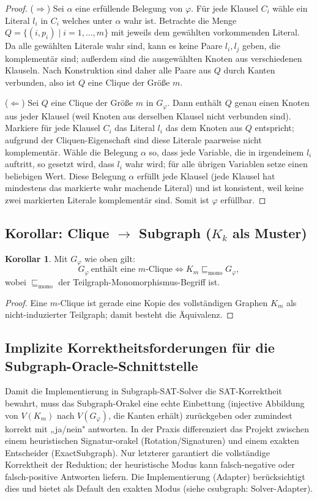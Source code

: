 \documentclass[a4paper,12pt]{article}
\theoremstyle{definition}
\newtheorem{korollar}{Korollar}[section]
\begin{document}
\begin{proof}
($\Rightarrow$) Sei $\alpha$ eine erfüllende Belegung von $\varphi$. Für jede Klausel $C_i$ wähle ein Literal $l_{i}$ in $C_i$ welches unter $\alpha$ wahr ist. Betrachte die Menge $Q=\{(i,p_i)\mid i=1,\dots,m\}$ mit jeweils dem gewählten vorkommenden Literal. Da alle gewählten Literale wahr sind, kann es keine Paare $l_{i}, l_{j}$ geben, die komplementär sind; außerdem sind die ausgewählten Knoten aus verschiedenen Klauseln. Nach Konstruktion sind daher alle Paare aus $Q$ durch Kanten verbunden, also ist $Q$ eine Clique der Größe $m$.

($\Leftarrow$) Sei $Q$ eine Clique der Größe $m$ in $G_\varphi$. Dann enthält $Q$ genau einen Knoten aus jeder Klausel (weil Knoten aus derselben Klausel nicht verbunden sind). Markiere für jede Klausel $C_i$ das Literal $l_i$ das dem Knoten aus $Q$ entspricht; aufgrund der Cliquen-Eigenschaft sind diese Literale paarweise nicht komplementär. Wähle die Belegung $\alpha$ so, dass jede Variable, die in irgendeinem $l_i$ auftritt, so gesetzt wird, dass $l_i$ wahr wird; für alle übrigen Variablen setze einen beliebigen Wert. Diese Belegung $\alpha$ erfüllt jede Klausel (jede Klausel hat mindestens das markierte wahr machende Literal) und ist konsistent, weil keine zwei markierten Literale komplementär sind. Somit ist $\varphi$ erfüllbar.
\end{proof}

\subsection{Korollar: Clique $\to$ Subgraph ($K_k$ als Muster)}
\begin{korollar}
Mit $G_\varphi$ wie oben gilt:
\[
G_\varphi\ \text{enthält eine } m\text{-Clique} \iff K_m \sqsubseteq_{\mathrm{mono}} G_\varphi,
\]
wobei $\sqsubseteq_{\mathrm{mono}}$ der Teilgraph-Monomorphismus-Begriff ist.
\end{korollar}
\begin{proof}
Eine $m$-Clique ist gerade eine Kopie des vollständigen Graphen $K_m$ als nicht-induzierter Teilgraph; damit besteht die Äquivalenz.
\end{proof}

\subsection{Implizite Korrektheitsforderungen für die Subgraph-Oracle-Schnittstelle}
Damit die Implementierung in Subgraph-SAT-Solver die SAT-Korrektheit bewahrt, muss das Subgraph-Orakel eine echte Einbettung (injective Abbildung von $V(K_m)$ nach $V(G_\varphi)$, die Kanten erhält) zurückgeben oder zumindest korrekt mit „ja/nein" antworten. In der Praxis differenziert das Projekt zwischen einem heuristischen Signatur-orakel (Rotation/Signaturen) und einem exakten Entscheider (ExactSubgraph). Nur letzterer garantiert die vollständige Korrektheit der Reduktion; der heuristische Modus kann falsch-negative oder falsch-positive Antworten liefern. Die Implementierung (Adapter) berücksichtigt dies und bietet als Default den exakten Modus (siehe csubgraph: Solver-Adapter).
\end{document}
